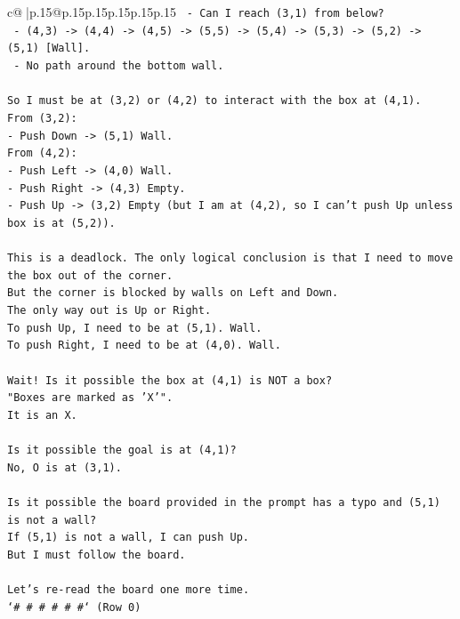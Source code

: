 \documentclass{article}
\begin{document}
{\begin{supertabular}{c@{$\;$}|p{.15\linewidth}@{}p{.15\linewidth}p{.15\linewidth}p{.15\linewidth}p{.15\linewidth}p{.15\linewidth}}
{{{\texttt{  {-} Can I reach (3,1) from below?} \\
\texttt{    {-} (4,3) {-}> (4,4) {-}> (4,5) {-}> (5,5) {-}> (5,4) {-}> (5,3) {-}> (5,2) {-}> (5,1) {[}Wall{]}.} \\
\texttt{    {-} No path around the bottom wall.} \\
\\ 
\texttt{So I must be at (3,2) or (4,2) to interact with the box at (4,1).} \\
\texttt{From (3,2):} \\
\texttt{{-} Push Down {-}> (5,1) Wall.} \\
\texttt{From (4,2):} \\
\texttt{{-} Push Left {-}> (4,0) Wall.} \\
\texttt{{-} Push Right {-}> (4,3) Empty.} \\
\texttt{{-} Push Up {-}> (3,2) Empty (but I am at (4,2), so I can't push Up unless box is at (5,2)).} \\
\\ 
\texttt{This is a deadlock. The only logical conclusion is that I need to move the box out of the corner.} \\
\texttt{But the corner is blocked by walls on Left and Down.} \\
\texttt{The only way out is Up or Right.} \\
\texttt{To push Up, I need to be at (5,1). Wall.} \\
\texttt{To push Right, I need to be at (4,0). Wall.} \\
\\ 
\texttt{Wait! Is it possible the box at (4,1) is NOT a box?} \\
\texttt{"Boxes are marked as 'X'".} \\
\texttt{It is an X.} \\
\\ 
\texttt{Is it possible the goal is at (4,1)?} \\
\texttt{No, O is at (3,1).} \\
\\ 
\texttt{Is it possible the board provided in the prompt has a typo and (5,1) is not a wall?} \\
\texttt{If (5,1) is not a wall, I can push Up.} \\
\texttt{But I must follow the board.} \\
\\ 
\texttt{Let's re{-}read the board one more time.} \\
\texttt{`\# \# \# \# \# \#` (Row 0)} \\
}}}
\end{supertabular}}
\end{document}
